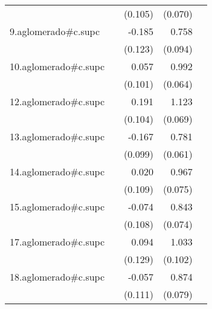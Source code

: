 {\begin{longtable}{l*{4}{D{.}{.}{-1}}}
            &                     &     (0.105)         &     (0.070)         &                     \\
\addlinespace
9.aglomerado#c.supc&                     &      -0.185         &       0.758\sym{***}&                     \\
            &                     &     (0.123)         &     (0.094)         &                     \\
\addlinespace
10.aglomerado#c.supc&                     &       0.057         &       0.992\sym{***}&                     \\
            &                     &     (0.101)         &     (0.064)         &                     \\
\addlinespace
12.aglomerado#c.supc&                     &       0.191         &       1.123\sym{***}&                     \\
            &                     &     (0.104)         &     (0.069)         &                     \\
\addlinespace
13.aglomerado#c.supc&                     &      -0.167         &       0.781\sym{***}&                     \\
            &                     &     (0.099)         &     (0.061)         &                     \\
\addlinespace
14.aglomerado#c.supc&                     &       0.020         &       0.967\sym{***}&                     \\
            &                     &     (0.109)         &     (0.075)         &                     \\
\addlinespace
15.aglomerado#c.supc&                     &      -0.074         &       0.843\sym{***}&                     \\
            &                     &     (0.108)         &     (0.074)         &                     \\
\addlinespace
17.aglomerado#c.supc&                     &       0.094         &       1.033\sym{***}&                     \\
            &                     &     (0.129)         &     (0.102)         &                     \\
\addlinespace
18.aglomerado#c.supc&                     &      -0.057         &       0.874\sym{***}&                     \\
            &                     &     (0.111)         &     (0.079)         &                     \\

\end{longtable}}
